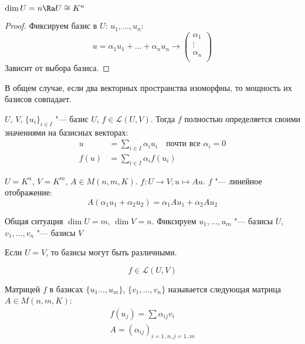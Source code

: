 \begin{conseq}
	$\dim U = n \Ra U \cong K^n$
\end{conseq}
\begin{proof}
	Фиксируем базис в $U$: $u_1, \dots, u_n$:
	\[
		u = \alpha_1 u_1 + \dots + \alpha_n u_n \to
		\begin{pmatrix}
			\alpha_1 \\
			\vdots \\
			\alpha_n \\
		\end{pmatrix}
	\]
	Зависит от выбора базиса.
\end{proof}

\begin{Rem}
	В общем случае, если два векторных пространства изоморфны, то мощность их базисов совпадает.
\end{Rem}

\begin{Rem}
	$U$, $V$, $\{u_i\}_{i \in I}$ "--- базис $U$, $f \in \mathcal{L}(U, V)$.
	Тогда $f$ полностью определяется своими значениями на базисных векторах:
	\begin{align*}
		u &= \sum_{i \in I} \alpha_i u_i \quad \text{почти все $\alpha_i = 0$} \\
		f(u) &= \sum_{i \in I}\alpha_if(u_i)
	\end{align*}
\end{Rem}

\begin{exmp}
	$U = K^n$, $V = K^m$, $A \in M(n, m, K)$.
	$f \colon U \to V; u \mapsto Au$.
	$f$ "--- линейное отображение:
	\[ A(\alpha_1 u_1 + \alpha_2 u_2) = \alpha_1Au_1 + \alpha_2 A u_2 \]

	Общая ситуация $\dim U = m$, $\dim V = n$.
	Фиксируем $u_1, \dots, u_m$ "--- базисы $U$, $v_1, \dots, v_n$ "--- базисы $V$
	\begin{Rem}
		Если $U = V$, то базисы могут быть различными.
	\end{Rem}
	\[ f \in \mathcal{L}(U,V) \]
\end{exmp}

\begin{Def}
	Матрицей $f$ в базисах $\{u_1 \dots, u_m\}$, $\{v_1, \dots, v_n\}$ называется следующая матрица $A \in M(n, m, K)$:
	\begin{gather*}
		f(u_j) = \sum\alpha_{ij}v_i \\
		A = (\alpha_{ij})_{i = 1..n, j = 1..m}
	\end{gather*}
\end{Def}

